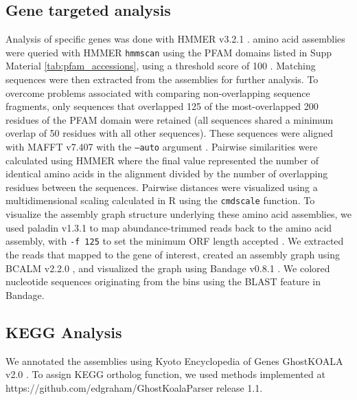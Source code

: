 \subsection*{Gene targeted analysis}

Analysis of specific genes was done with HMMER v3.2.1
\cite{hmmer}. \plass amino acid assemblies were queried with HMMER {\tt hmmscan}
 using the PFAM domains listed in Supp Material \ref{tab:pfam_accessions}, 
using a threshold score of 100 \cite{pfam}. Matching sequences were then
extracted from the assemblies for further analysis. To overcome
problems associated with comparing non-overlapping sequence fragments,
only sequences that overlapped 125 of the most-overlapped 200 residues
of the PFAM domain were retained (all sequences shared a minimum
overlap of 50 residues with all other sequences). These sequences were
aligned with MAFFT v7.407 with the {\tt --auto} argument \cite{mafft}. Pairwise similarities were
calculated using HMMER where the final value represented the number of
identical amino acids in the alignment divided by the number of
overlapping residues between the sequences. Pairwise distances were
visualized using a multidimensional scaling calculated in R using the
{\tt cmdscale} function. To visualize the assembly graph structure
underlying these amino acid assemblies, we used paladin v1.3.1 
to map abundance-trimmed reads back to the \plass amino acid assembly,
with {\tt -f 125} to set the minimum ORF length accepted \cite{paladin}. 
We extracted the reads that mapped to the gene of interest, created an
assembly graph using BCALM v2.2.0 \cite{chikhi2016compacting}, and
visualized the graph using Bandage v0.8.1 \cite{bandage}. We colored
nucleotide sequences originating from the bins using the BLAST feature
in Bandage.

\subsection*{KEGG Analysis}

We annotated the \plass assemblies using Kyoto Encyclopedia of Genes
GhostKOALA v2.0 \cite{kegg}. To assign KEGG ortholog function, we used
methods implemented at https://github.com/edgraham/GhostKoalaParser
release 1.1.
